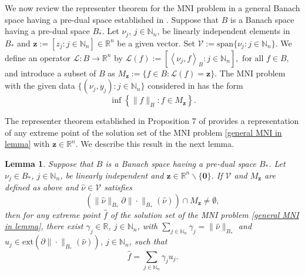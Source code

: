 \documentclass[11pt]{article}
\newtheorem{lemma}[theorem]{Lemma}
\begin{document}
We now review the  representer theorem for the MNI problem in a general Banach space having a pre-dual space established in \cite{wang2023sparse}.  Suppose that $B$ is a Banach space having a pre-dual space $B_*$. Let $\nu_j$, $j\in\mathbb{N}_n$, be linearly independent elements in $B_*$ and $\mathbf{z}:=[z_j:j\in\mathbb{N}_n]\in\mathbb{R}^n$ be a given vector. Set $\mathcal{V}:=\mathrm{span}\{\nu_j:j\in\mathbb{N}_n\}$.
%
%
%
We define an operator $\mathcal{L}: B \rightarrow \mathbb{R}^{n}$ by  
%
    $\mathcal{L}(f):=\left[\left\langle\nu_{j}, f\right\rangle_{B}: j \in \mathbb{N}_{n}\right], \text { for all } f \in B,$
%
and introduce a subset of $B$ as
%
    ${M_{\mathbf{z}}}:=\{f \in B: \mathcal{L}(f)=\mathbf{z}\}$.
The MNI problem with the given data $\{(\nu_j,y_j):j\in\mathbb{N}_n\}$ considered in \cite{wang2023sparse} has the form   
\begin{equation}\label{general MNI in lemma}
    \inf \left\{\|f\|_{B}: f \in {M_{\mathbf{z}}}\right\}.
\end{equation}
 
The representer theorem established in Proposition 7 of \cite{wang2023sparse} provides a representation of any extreme point of the solution set of the MNI problem \eqref{general MNI in lemma} with $\mathbf{z}\in\mathbb{R}^n$. We describe this result  in the next lemma. 

\begin{lemma}\label{lemma: representer for MNI}
Suppose that $B$ is a Banach space having a pre-dual space $B_{*}$. Let $\nu_{j} \in B_{*}$, $j \in \mathbb{N}_{n}$, be linearly independent and $\mathbf{z} \in \mathbb{R}^{n}\backslash\{\mathbf{0}\}$. If  $\mathcal{V}$ and   ${M_{\mathbf{z}}}$ are defined as above and $\hat\nu\in\mathcal{V}$ satisfies 
\begin{equation}\label{Non-empty-set in lemma}
(\|\hat\nu\|_{B_*}\partial\|\cdot\|_{B_*}(\hat\nu))\cap{M_{\mathbf{z}}}\neq\emptyset,
\end{equation}
then for any extreme point $\hat f$ of the solution set of the MNI problem \eqref{general MNI in lemma}, there exist $\gamma_j\in\mathbb{R}$, $j\in\mathbb{N}_{n}$, with  $\sum_{j\in\mathbb{N}_{n}}\gamma_j=\|\hat\nu\|_{B_*}$ and $u_j\in\mathrm{ext}\left(\partial\|\cdot\|_{B_*}(\hat\nu)\right)$, $j\in\mathbb{N}_{n}$, such that
\begin{equation*}\label{eq: expansion of p in lemma}
\hat f=\sum\limits_{j\in\mathbb{N}_{n}} \gamma_j u_j.
\end{equation*}
\end{lemma}
\end{document}

